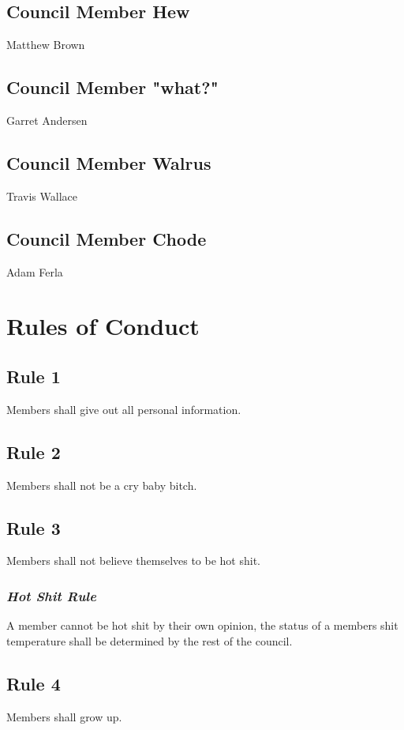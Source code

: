 \documentclass[]{article}
\begin{document}
	\subsection{Council Member Hew}
	\label{subsec:matt}
		Matthew Brown
	\subsection{Council Member "what?"}
	\label{subsec:gary}
		Garret Andersen
	\subsection{Council Member Walrus}
	\label{subsec:travis}
		Travis Wallace
	\subsection{Council Member Chode}
	\label{subsec:adam}
		Adam Ferla
	
\newpage
\section{Rules of Conduct}
\label{sec:rulesConduct}

\subsection{Rule 1}
Members shall give out all personal information.

\subsection{Rule 2}
Members shall not be a cry baby bitch.

\subsection{Rule 3}
Members shall not believe themselves to be hot shit.
\subsubsection{\textit{Hot Shit Rule}}
A member cannot be hot shit by their own opinion, the status of a members shit temperature shall be determined by the rest of the council.

\subsection{Rule 4}
Members shall grow up.
\end{document}

